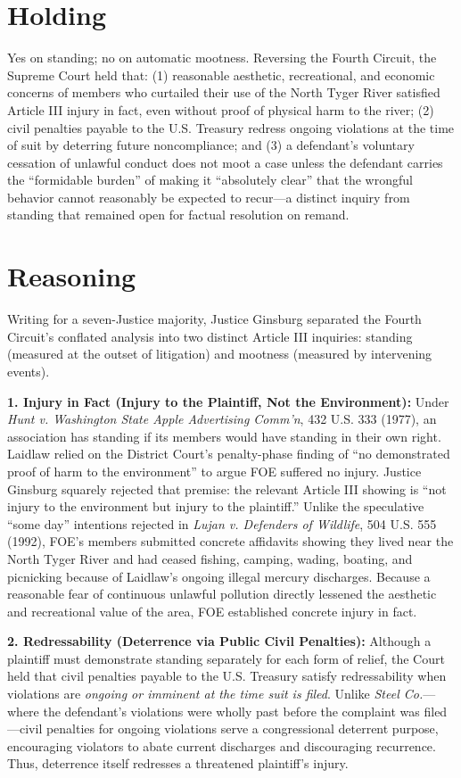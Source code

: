 \documentclass[12pt]{article}
\begin{document}
\section{Holding}
Yes on standing; no on automatic mootness. Reversing the Fourth Circuit, the Supreme Court held that: (1) reasonable aesthetic, recreational, and economic concerns of members who curtailed their use of the North Tyger River satisfied Article III injury in fact, even without proof of physical harm to the river; (2) civil penalties payable to the U.S. Treasury redress ongoing violations at the time of suit by deterring future noncompliance; and (3) a defendant's voluntary cessation of unlawful conduct does not moot a case unless the defendant carries the ``formidable burden'' of making it ``absolutely clear'' that the wrongful behavior cannot reasonably be expected to recur---a distinct inquiry from standing that remained open for factual resolution on remand.

\section{Reasoning}
Writing for a seven-Justice majority, Justice Ginsburg separated the Fourth Circuit's conflated analysis into two distinct Article III inquiries: standing (measured at the outset of litigation) and mootness (measured by intervening events).

\textbf{1. Injury in Fact (Injury to the Plaintiff, Not the Environment):} Under \textit{Hunt v. Washington State Apple Advertising Comm'n}, 432 U.S. 333 (1977), an association has standing if its members would have standing in their own right. Laidlaw relied on the District Court's penalty-phase finding of ``no demonstrated proof of harm to the environment'' to argue FOE suffered no injury. Justice Ginsburg squarely rejected that premise: the relevant Article III showing is ``not injury to the environment but injury to the plaintiff.'' Unlike the speculative ``some day'' intentions rejected in \textit{Lujan v. Defenders of Wildlife}, 504 U.S. 555 (1992), FOE's members submitted concrete affidavits showing they lived near the North Tyger River and had ceased fishing, camping, wading, boating, and picnicking because of Laidlaw's ongoing illegal mercury discharges. Because a reasonable fear of continuous unlawful pollution directly lessened the aesthetic and recreational value of the area, FOE established concrete injury in fact.

\textbf{2. Redressability (Deterrence via Public Civil Penalties):} Although a plaintiff must demonstrate standing separately for each form of relief, the Court held that civil penalties payable to the U.S. Treasury satisfy redressability when violations are \textit{ongoing or imminent at the time suit is filed}. Unlike \textit{Steel Co.}---where the defendant's violations were wholly past before the complaint was filed---civil penalties for ongoing violations serve a congressional deterrent purpose, encouraging violators to abate current discharges and discouraging recurrence. Thus, deterrence itself redresses a threatened plaintiff's injury.
\end{document}
